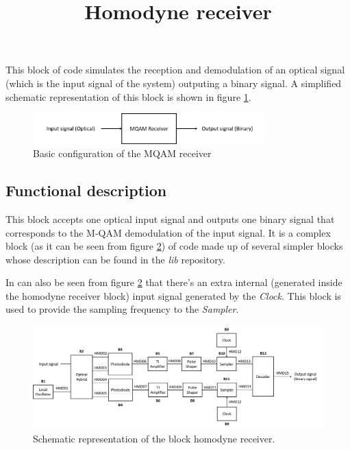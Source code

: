\documentclass[a4paper]{article}
\title{Homodyne receiver}
\begin{document}
\maketitle

This block of code simulates the reception and demodulation of an optical signal (which is the input signal of the system) outputing a binary signal. A simplified schematic representation of this block is shown in figure \ref{MQAM_receiver_block_diagram_simple}.

\begin{figure}[h]
	\centering
	\includegraphics[width=0.8\textwidth]{MQAM_receiver_block_diagram_simple}
	\caption{Basic configuration of the MQAM receiver}\label{MQAM_receiver_block_diagram_simple}
\end{figure}

\subsection*{Functional description}

This block accepts one optical input signal and outputs one binary signal that corresponds to the M-QAM demodulation of the input signal. It is a complex block (as it can be seen from figure \ref{MQAM_receiver_block_diagram}) of code made up of several simpler blocks whose description can be found in the \textit{lib} repository.

In can also be seen from figure \ref{MQAM_receiver_block_diagram} that there's an extra internal (generated inside the homodyne receiver block) input signal generated by the \textit{Clock}. This block is used to provide the sampling frequency to the \textit{Sampler}.


\begin{figure}[h]
	\centering
	\includegraphics[width=\textwidth]{MQAM_receiver_block_diagram}
	\caption{Schematic representation of the block homodyne receiver.}\label{MQAM_receiver_block_diagram}
\end{figure}
\end{document}
